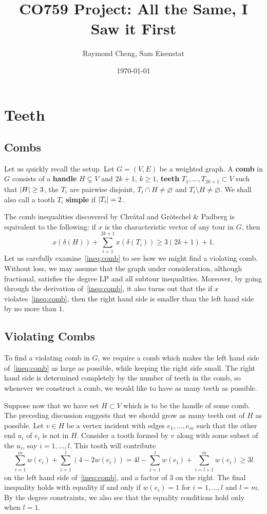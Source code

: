 \documentclass[11pt, letterpaper]{amsart}
\title{CO759 Project: All the Same, I Saw it First}
\author{Raymond Cheng, Sam Eisenstat}
\date{\today}
\theoremstyle{plain}
\theoremstyle{definition}
\theoremstyle{remark}
\DeclarePairedDelimiter{\abs}{\lvert}{\rvert}
\begin{document}
\maketitle

\section{Teeth}
\subsection{Combs}
Let us quickly recall the setup. Let $G = (V,E)$ be a weighted graph. A
\textbf{comb} in $G$ consists of a \textbf{handle} $H \subsetneq V$ and $2k+1$,
$k \geq 1$, \textbf{teeth} $T_1,\ldots,T_{2k+1} \subset V$ such that $\abs{H}
\geq 3$, the $T_i$ are pairwise disjoint, $T_i \cap H \neq \varnothing$ and
$T_i \setminus H \neq \varnothing$. We shall also call a tooth $T_i$
\textbf{simple} if $\abs{T_i} = 2$.

The comb inequalities discovered by Chv\'atal and Gr\"otschel \& Padberg is
equivalent to the following: if $x$ is the characteristic vector of any tour in
$G$, then
\begin{equation}\label{ineq:comb}
  x(\delta(H)) + \sum^{2k+1}_{i = 1}x(\delta(T_i)) \geq 3(2k+1) + 1.
\end{equation}
Let us carefully examine~\eqref{ineq:comb} to see how we might find a violating comb.
Without loss, we may assume that the graph under consideration, although
fractional, satisfies the degree LP and all subtour inequalities. Moreover, by
going through the derivation of~\eqref{ineq:comb}, it also turns out that the if $x$
violates~\eqref{ineq:comb}, then the right hand side is smaller than the left hand side by
no more than $1$.

\subsection{Violating Combs}
To find a violating comb in $G$, we require a comb which makes the left hand
side of~\eqref{ineq:comb} as large as possible, while keeping the right side small. The
right hand side is determined completely by the number of teeth in the comb, so
whenever we construct a comb, we would like to have as many teeth as possible.

Suppose now that we have set $H \subset V$ which is to be the handle of some
comb.  The preceding discussion suggests that we should grow as many teeth out
of $H$ as possible. Let $v \in H$ be a vertex incident with edges
$e_1,\ldots,e_m$ such that the other end $u_i$ of $e_i$ is not in $H$. Consider
a tooth formed by $v$ along with some subset of the $u_i$, say $i =
1,\ldots,l$. This tooth will contribute
\begin{equation*}
  \sum^m_{i = 1}w(e_i) + \sum^l_{i = 1} (4 - 2w(e_i)) = 4l - \sum^l_{i = 1} w(e_i) + \sum^m_{i = l + 1}w(e_i) \geq 3l
\end{equation*}
on the left hand side of~\eqref{ineq:comb}, and a factor of $3$ on the right. The final
inequality holds with equality if and only if $w(e_i) = 1$ for $i = 1,\ldots,l$
and $l = m$. By the degree constraints, we also see that the equality conditions
hold only when $l = 1$.
\end{document}
